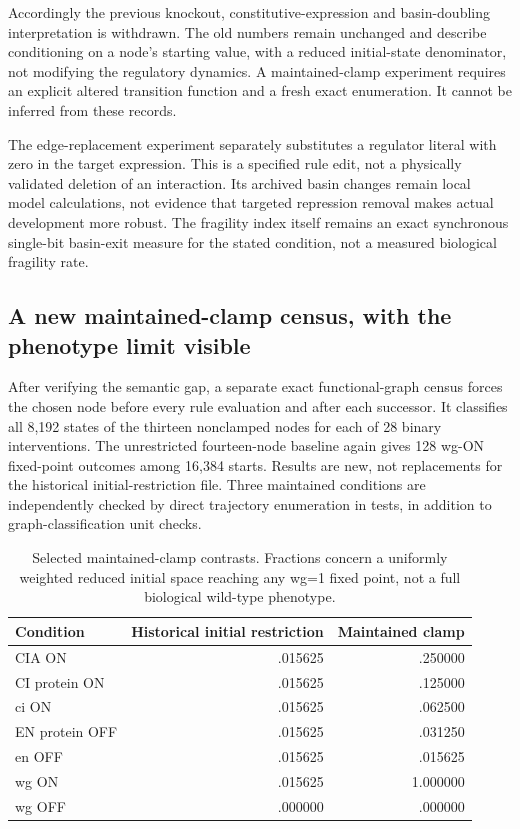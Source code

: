 Accordingly the previous knockout, constitutive-expression and basin-doubling interpretation is withdrawn. The old numbers remain unchanged and describe conditioning on a node's starting value, with a reduced initial-state denominator, not modifying the regulatory dynamics. A maintained-clamp experiment requires an explicit altered transition function and a fresh exact enumeration. It cannot be inferred from these records.

The edge-replacement experiment separately substitutes a regulator literal with zero in the target expression. This is a specified rule edit, not a physically validated deletion of an interaction. Its archived basin changes remain local model calculations, not evidence that targeted repression removal makes actual development more robust. The fragility index itself remains an exact synchronous single-bit basin-exit measure for the stated condition, not a measured biological fragility rate.

\subsection{A new maintained-clamp census, with the phenotype limit visible}
After verifying the semantic gap, a separate exact functional-graph census forces the chosen node before every rule evaluation and after each successor. It classifies all 8,192 states of the thirteen nonclamped nodes for each of 28 binary interventions. The unrestricted fourteen-node baseline again gives 128 wg-ON fixed-point outcomes among 16,384 starts. Results are new, not replacements for the historical initial-restriction file. Three maintained conditions are independently checked by direct trajectory enumeration in tests, in addition to graph-classification unit checks.

\begin{table}[!htbp]\centering\small
\caption{Selected maintained-clamp contrasts. Fractions concern a uniformly weighted reduced initial space reaching any wg=1 fixed point, not a full biological wild-type phenotype.}
\begin{tabular}{lrr}\hline\hline
Condition & Historical initial restriction & Maintained clamp \\\hline
CIA ON & .015625 & .250000 \\
CI protein ON & .015625 & .125000 \\
ci ON & .015625 & .062500 \\
EN protein OFF & .015625 & .031250 \\
en OFF & .015625 & .015625 \\
wg ON & .015625 & 1.000000 \\
wg OFF & .000000 & .000000 \\\hline\hline
\end{tabular}
\end{table}

